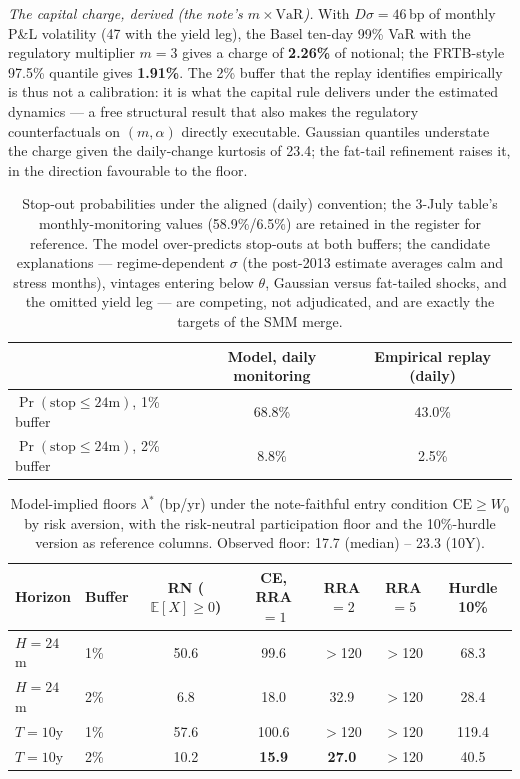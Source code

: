 \documentclass[11pt]{article}
\newcommand{\CE}{\mathrm{CE}}
\newcommand{\VaR}{\mathrm{VaR}}
\begin{document}
\emph{The capital charge, derived (the note's $m\times\VaR$).} With $D\sigma=46$\,bp of monthly P\&L volatility (47 with the yield leg), the Basel ten-day 99\% VaR with the regulatory multiplier $m=3$ gives a charge of \textbf{2.26\%} of notional; the FRTB-style 97.5\% quantile gives \textbf{1.91\%}. The 2\% buffer that the replay identifies empirically is thus not a calibration: it is what the capital rule delivers under the estimated dynamics --- a free structural result that also makes the regulatory counterfactuals on $(m,\alpha)$ directly executable. Gaussian quantiles understate the charge given the daily-change kurtosis of 23.4; the fat-tail refinement raises it, in the direction favourable to the floor.

\begin{table}[h!]
\centering\small
\begin{tabular}{lcc}
\toprule
 & Model, daily monitoring & Empirical replay (daily) \\
\midrule
$\Pr(\text{stop}\le24\text{m})$, 1\% buffer & 68.8\% & 43.0\% \\
$\Pr(\text{stop}\le24\text{m})$, 2\% buffer & 8.8\% & 2.5\% \\
\bottomrule
\end{tabular}
\caption{Stop-out probabilities under the aligned (daily) convention; the 3-July table's monthly-monitoring values (58.9\%/6.5\%) are retained in the register for reference. The model over-predicts stop-outs at both buffers; the candidate explanations --- regime-dependent $\sigma$ (the post-2013 estimate averages calm and stress months), vintages entering below $\theta$, Gaussian versus fat-tailed shocks, and the omitted yield leg --- are competing, not adjudicated, and are exactly the targets of the SMM merge.}
\end{table}

\begin{table}[h!]
\centering\small
\begin{tabular}{llccccc}
\toprule
Horizon & Buffer & RN ($\mathbb{E}[X]\ge0$) & CE, RRA$=1$ & RRA$=2$ & RRA$=5$ & Hurdle 10\% \\
\midrule
$H=24$m & 1\% & 50.6 & 99.6 & $>$120 & $>$120 & 68.3 \\
$H=24$m & 2\% & 6.8 & 18.0 & 32.9 & $>$120 & 28.4 \\
$T=10$y & 1\% & 57.6 & 100.6 & $>$120 & $>$120 & 119.4 \\
$T=10$y & 2\% & 10.2 & \textbf{15.9} & \textbf{27.0} & $>$120 & 40.5 \\
\bottomrule
\end{tabular}
\caption{Model-implied floors $\lambda^*$ (bp/yr) under the note-faithful entry condition $\CE\ge W_0$ by risk aversion, with the risk-neutral participation floor and the 10\%-hurdle version as reference columns. Observed floor: 17.7 (median) -- 23.3 (10Y).}
\end{table}
\end{document}

